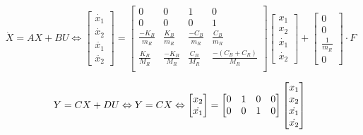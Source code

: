 \documentclass[a4paper,12pt]{article}
\begin{document}
    \begin{equation}
        \dot{X}=AX+BU
        \Leftrightarrow
        \begin{bmatrix}
            \dot{x_1}\\
            \dot{x_2}\\
            \ddot{x_1}\\
            \ddot{x_2}
        \end{bmatrix}
        =
        \begin{bmatrix}
            0 & 0 & 1 & 0\\
            0 & 0 & 0 & 1\\
            \frac{-K_B}{m_R} & \frac{K_B}{m_R} & \frac{-C_B}{m_R} & \frac{C_B}{m_R}\\
            \frac{K_B}{M_R} & \frac{-K_B}{M_R} & \frac{C_B}{M_R} & \frac{-(C_B+C_R)}{M_R}\\
        \end{bmatrix}
        \begin{bmatrix}
            x_1\\
            x_2\\
            \dot{x_1}\\
            \dot{x_2}
        \end{bmatrix}
        +
        \begin{bmatrix}
            0\\
            0\\
            \frac{1}{m_R}\\
            0
        \end{bmatrix}
        \cdot F
        \label{eq:VarEtatXDot}
    \end{equation}
    
    \begin{equation}
        Y=CX+DU
        \Leftrightarrow
        Y=CX
        \Leftrightarrow
        \begin{bmatrix}
            x_2\\
            \dot{x_1}
        \end{bmatrix}
        =
        \begin{bmatrix}
            0 & 1 & 0 & 0\\
            0 & 0 & 1 & 0
        \end{bmatrix}
        \begin{bmatrix}
            x_1\\
            x_2\\
            \dot{x_1}\\
            \dot{x_2}
        \end{bmatrix}\\
        \label{eq:VarEtatY}
    \end{equation}
    
\end{document}
